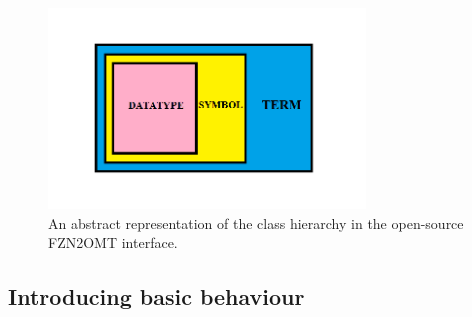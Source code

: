 \begin{figure}
    \centering
    \includegraphics[width=0.75\textwidth]{images/hierarchy.png}
    \caption{An abstract representation of the class hierarchy in the open-source FZN2OMT interface.}
    \label{fig:my_label}
\end{figure}

\subsection{Introducing basic behaviour}

